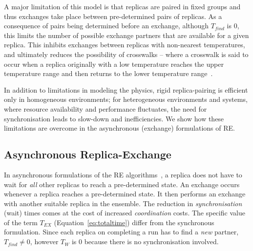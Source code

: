 \documentclass{rspublic}
\begin{document}
A major limitation of this model is that replicas are paired in fixed
groups and thus exchanges take place between pre-determined pairs of
replicas.  As a consequence of pairs being determined before an
exchange, although $T_{find}$ is $0$, this limits the number of possible
exchange partners that are available for a given replica. This
inhibits exchanges between replicas with non-nearest temperatures, and
ultimately reduces the possibility of crosswalks -- where a crosswalk
is said to occur when a replica originally with a low temperature
reaches the upper temperature range and then returns to the lower
temperature range~\citep{parashar_arepex}.


In addition to limitations in modeling the physics, rigid
replica-pairing is efficient only in homogeneous environments; for
heterogeneous environments and systems, where resource availability and
performance fluctuates, the need for synchronisation leads to
slow-down and inefficiencies. We show how these limitations are
overcome in the asynchronous (exchange) formulations of RE.

\subsection{Asynchronous Replica-Exchange}


In asynchronous formulations of the RE
algorithms~\citep{parashar_arepex,DBLP:journals/jcc/GallicchioLP08}, a
replica does not have to wait for {\it all} other replicas to reach a
pre-determined state. An exchange occurs whenever a replica reaches a
pre-determined state. It then performs an exchange with another
suitable replica in the ensemble.  The reduction in {\it
  synchronisation} (wait) times comes at the cost of increased {\it
  coordination} costs.  The specific value of the term $T_{EX}$
(Equation~\ref{eq:totaltime}) differ from the synchronous formulation.
Since each replica on completing a run has to find a {\it new}
partner, $T_{find} \neq 0$, however $T_W$ is 0 because there is no
synchronisation involved. %
\end{document}
